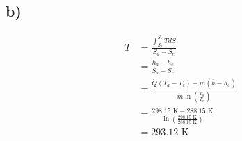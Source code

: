 

\subsection*{b)}

\begin{align*}
\overline{T} &= \frac{\int_{S_a}^{S_e} T dS}{S_a - S_e} \\
&= \frac{h_a - h_e}{S_a - S_e} \\
&= \frac{\dot{Q} (T_a - T_e) + \dot{m} (\overline{h} - h_e)}{\dot{m} \ln \left( \frac{T_a}{T_e} \right)} \\
&= \frac{298.15 \text{ K} - 288.15 \text{ K}}{\ln \left( \frac{298.15 \text{ K}}{288.15 \text{ K}} \right)} \\
&= 293.12 \text{ K}
\end{align*}